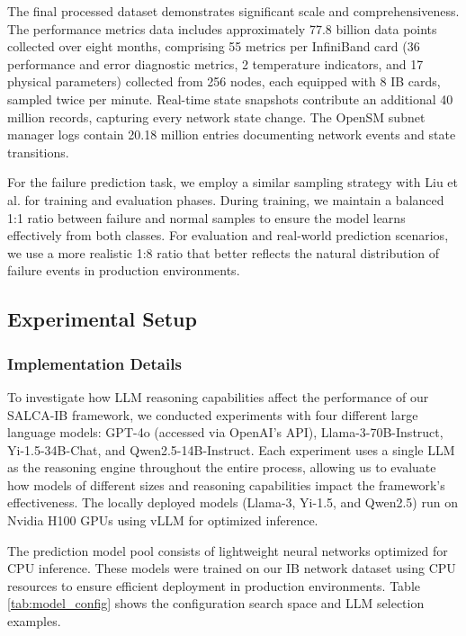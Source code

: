 \documentclass[conference]{IEEEtran}
\begin{document}
The final processed dataset demonstrates significant scale and comprehensiveness. The performance metrics data includes approximately 77.8 billion data points collected over eight months, comprising 55 metrics per InfiniBand card (36 performance and error diagnostic metrics, 2 temperature indicators, and 17 physical parameters) collected from 256 nodes, each equipped with 8 IB cards, sampled twice per minute. Real-time state snapshots contribute an additional 40 million records, capturing every network state change. The OpenSM subnet manager logs contain 20.18 million entries documenting network events and state transitions. 

For the failure prediction task, we employ a similar sampling strategy with Liu et al. \cite{b8} for training and evaluation phases. During training, we maintain a balanced 1:1 ratio between failure and normal samples to ensure the model learns effectively from both classes. For evaluation and real-world prediction scenarios, we use a more realistic 1:8 ratio that better reflects the natural distribution of failure events in production environments. 

\subsection{Experimental Setup}

\subsubsection{Implementation Details}
To investigate how LLM reasoning capabilities affect the performance of our SALCA-IB framework, we conducted experiments with four different large language models: GPT-4o (accessed via OpenAI's API), Llama-3-70B-Instruct, Yi-1.5-34B-Chat, and Qwen2.5-14B-Instruct. Each experiment uses a single LLM as the reasoning engine throughout the entire process, allowing us to evaluate how models of different sizes and reasoning capabilities impact the framework's effectiveness. The locally deployed models (Llama-3, Yi-1.5, and Qwen2.5) run on Nvidia H100 GPUs using vLLM for optimized inference.

The prediction model pool consists of lightweight neural networks optimized for CPU inference. These models were trained on our IB network dataset using CPU resources to ensure efficient deployment in production environments. Table \ref{tab:model_config} shows the configuration search space and LLM selection examples.
\end{document}
